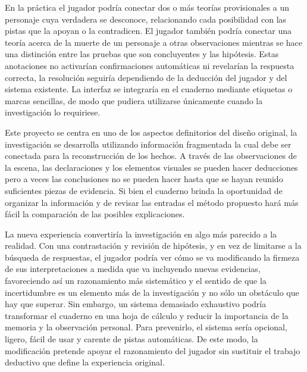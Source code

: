 \documentclass[12pt,a4paper]{article}
\begin{document}
En la práctica el jugador podría conectar dos o más teorías provisionales a un personaje cuya verdadera se desconoce, relacionando cada posibilidad con las pistas que la apoyan o la contradicen. El jugador también podría conectar una teoría acerca de la muerte de un personaje a otras observaciones mientras se hace una distinción entre las pruebas que son concluyentes y las hipótesis. Estas anotaciones no activarían confirmaciones automáticas ni revelarían la respuesta correcta, la resolución seguiría dependiendo de la deducción del jugador y del sistema existente. La interfaz se integraría en el cuaderno mediante etiquetas o marcas sencillas, de modo que pudiera utilizarse únicamente cuando la investigación lo requiriese.

Este proyecto se centra en uno de los aspectos definitorios del diseño original, la investigación se desarrolla utilizando información fragmentada la cual debe ser conectada para la reconstrucción de los hechos. A través de las observaciones de la escena, las declaraciones y los elementos visuales se pueden hacer deducciones pero a veces las conclusiones no se pueden hacer hasta que se hayan reunido suficientes piezas de evidencia. Si bien el cuaderno brinda la oportunidad de organizar la información y de revisar las entradas el método propuesto hará más fácil la comparación de las posibles explicaciones.

La nueva experiencia convertiría la investigación en algo más parecido a la realidad. Con una contrastación y revisión de hipótesis, y en vez de limitarse a la búsqueda de respuestas, el jugador podría ver cómo se va modificando la firmeza de sus interpretaciones a medida que va incluyendo nuevas evidencias, favoreciendo así un razonamiento más sistemático y el sentido de que la incertidumbre es un elemento más de la investigación y no sólo un obstáculo que hay que superar. Sin embargo, un sistema demasiado exhaustivo podría transformar el cuaderno en una hoja de cálculo y reducir la importancia de la memoria y la observación personal. Para prevenirlo, el sistema sería opcional, ligero, fácil de usar y carente de pistas automáticas. De este modo, la modificación pretende apoyar el razonamiento del jugador sin sustituir el trabajo deductivo que define la experiencia original.


\newpage
\printbibliography[title={Referencias}]
\end{document}
